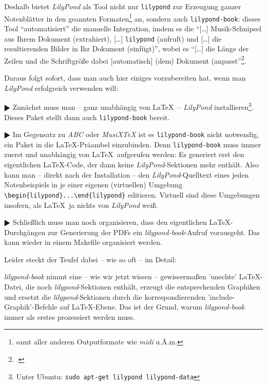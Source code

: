 Deshalb bietet \emph{LilyPond} als Tool nicht nur \texttt{lilypond} zur
Erzeugung ganzer Notenblätter in den geannten Formaten\footnote{samt aller
anderen Outputformate wie \emph{midi} u.Ä.m.} an, sondern auch
\texttt{lilypond-book}: dieses Tool \enquote{automatisiert} die manuelle Integration,
imdem es die \enquote{[\ldots] Musik-Schnipsel aus Ihrem Dokument (extrahiert),
[\ldots] \texttt{lilypond} (aufruft) und [\ldots] die resultierenden Bilder in
Ihr Dokument (einfügt)}, wobei es \enquote{[\ldots] die Länge der Zeilen und die
Schriftgröße dabei [automatisch] (dem) Dokument
(anpasst}\footcite[vgl.][20]{LilyPond2018e}.

Daraus folgt sofort, dass man auch hier einiges vorzubereiten hat, wenn man
\emph{LilyPond} erfolgreich verwenden will:

$\RHD$ Zunächst muss man -- ganz unabhängig von \LaTeX\ -- \emph{LilyPond}
installieren\footnote{Unter Ubuntu: \texttt{sudo apt-get lilypond
lilypond-data}}. Dieses Paket stellt dann auch \texttt{lilypond-book} bereit.
  
$\RHD$ Im Gegensatz zu \emph{ABC} oder \emph{MusiX\TeX} ist es
\texttt{lilypond-book} nicht notwendig, ein Paket in die \LaTeX-Präambel
einzubinden. Denn \texttt{lilypond-book} muss immer zuerst und unabhängig von
\LaTeX\ aufgerufen werden: Es generiert erst den eigentlichen \LaTeX-Code, der
dann keine \emph{LilyPond}-Sektionen mehr enthält. Also kann man -- direkt nach
der Installation -- den \emph{LilyPond}-Quelltext eines jeden Notenbeispiels in
je einer eigenen (virtuellen) Umgebung \verb|\begin{lilypond}...\end{lilypond}|
editieren. Virtuell sind diese Umgebungen insofern, als \LaTeX\ ja nichts von
\emph{LilyPond} weiß.

$\RHD$ Schließlich muss man noch organisieren, dass den eigentlichen
\LaTeX-Durchgängen zur Generierung der PDFs ein \emph{lilypond-book}-Aufruf
vorausgeht. Das kann wieder in einem Makefile organisiert werden.

Leider steckt der Teufel dabei -- wie so oft -- im Detail: 

\emph{lilypond-book} nimmt eine -- wie wir jetzt wissen -- gewissermaßen
'unechte' \LaTeX-Datei, die noch \emph{lilypond}-Sektionen enthält, erzeugt die
entsprechenden Graphiken und ersetzt die \emph{lilypond}-Sektionen durch die
korrespondierenden 'include-Graphik'-Befehle auf \LaTeX-Ebene. Das ist der
Grund, warum \emph{lilypond-book} immer als erstes prozessiert werden muss.

